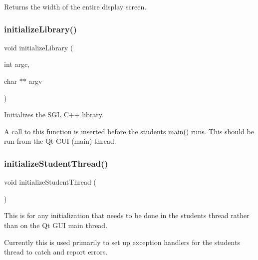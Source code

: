 Returns the width of the entire display screen. 

\mbox{\label{namespacesgl_ab36f2e19ed11765f2b025cc8e4636010}} 
\subsubsection{\texorpdfstring{initialize\+Library()}{initializeLibrary()}}
{\footnotesize\ttfamily void initialize\+Library (\begin{DoxyParamCaption}\item[{int}]{argc,  }\item[{char $\ast$$\ast$}]{argv }\end{DoxyParamCaption})}



Initializes the S\+GL C++ library. 

A call to this function is inserted before the student\textquotesingle{}s main() runs. This should be run from the Qt G\+UI (main) thread. \mbox{\label{namespacesgl_aa826ed0038c35ea532e22c6c0a4e6036}} 
\subsubsection{\texorpdfstring{initialize\+Student\+Thread()}{initializeStudentThread()}}
{\footnotesize\ttfamily void initialize\+Student\+Thread (\begin{DoxyParamCaption}{ }\end{DoxyParamCaption})}



This is for any initialization that needs to be done in the student\textquotesingle{}s thread rather than on the Qt G\+UI main thread. 

Currently this is used primarily to set up exception handlers for the student\textquotesingle{}s thread to catch and report errors. \mbox{\label{namespacesgl_a3dcad0cd9fe4e8b1c3c9b0a1dbd45504}} 
